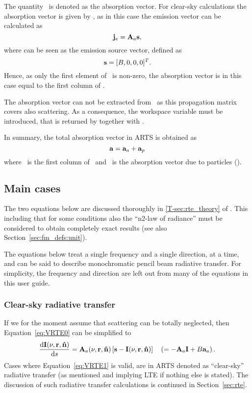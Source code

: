 The quantity \AbsVec\ is denoted as the absorption vector. For clear-sky
calculations the absorption vector is given by , as in this case the
emission vector can be calculated as
\begin{equation}
  \label{eq:evec2}
  \mathbf{j}_e = {\bf A}_{a}\mathbf{s},
\end{equation}
where  can be seen as the emission source vector, defined as
\begin{equation}
  \mathbf{s} = [B,0,0,0]^T.
\end{equation}
Hence, as only the first element of \ is non-zero, the absorption
vector is in this case equal to the first column of .

The absorption vector can not be extracted from \ as this
propagation matrix covers also scattering. As a consequence, the workspace
variable  must be introduced, that is returned by
 together with .

In summary, the total absorption vector in ARTS is obtained as
\begin{equation}
  \label{eq:evec3}
  {\bf a} = {\bf a}_{a} + {\bf a}_{p}
\end{equation}
where \ is the first column of \, and \ is the
absorption vector due to particles ().




\subsection{Main cases}
\label{sec:rteq:cases}
%
The two equations below are discussed thoroughly in \ref{T-sec:rte_theory} of
\theory. This including that for some conditions also the ``n2-law of
radiance'' must be considered to obtain completely exact results (see also
Section~\ref{sec:fm_defs:unit}).

The equations below treat a single frequency and a single direction,
at a time, and can be said to describe monochromatic pencil beam radiative
transfer. For simplicity, the frequency and direction are left out from many of
the equations in this user guide.

\subsubsection{Clear-sky radiative transfer}
%
If we for the moment assume that scattering can be totally neglected, then
Equation~\ref{eq:VRTE0} can be simplified to
\begin{equation}
  \label{eq:VRTE1}
  \frac{\mathrm{d}{\bf I}(\nu,{\bf r},{\bf \hat{n}})}{\mathrm{d} s} =
  {\bf A}_{a}(\nu,{\bf r},{\bf \hat{n}})\left[ \mathbf{s}- {\bf I}(\nu,{\bf r},{\bf \hat{n}})
  \right] \quad \left( = -{\bf A}_{a}{\bf I} + B{\bf a}_{a}\right).
\end{equation}
Cases where Equation~\ref{eq:VRTE1} is valid, are in ARTS denoted as
``clear-sky'' radiative transfer (as mentioned and implying LTE if nothing else
is stated). The discussion of such radiative transfer calculations is continued
in Section~\ref{sec:rte}. 


